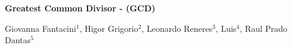 \begin{center}




\textbf{Greatest Common Divisor - (GCD)}\vspace{0.5cm}

Giovanna Fantacini$^1$, 
Higor Grigorio$^2$, 
Leonardo Reneres$^3$, 
Luis$^4$, 
Raul Prado Dantas$^5$











\end{center}

  
  
  
  


